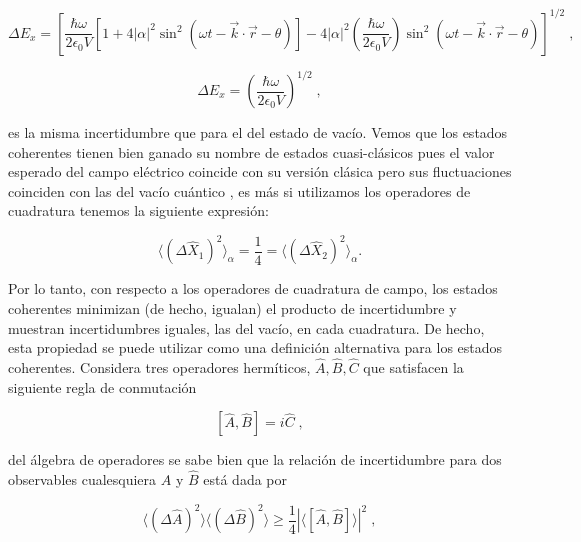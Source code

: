     \begin{equation}
        \Delta E_x = \left[\frac{\hbar\omega}{2\epsilon_0 V}\left[1 + 4|\alpha|^2\sin^2(\omega t - \Vec{k}\cdot \Vec{r} - \theta) \right] - 4|\alpha|^2\left(\frac{\hbar \omega}{2\epsilon_0V}\right)\sin^2(\omega t - \Vec{k}\cdot \Vec{r} - \theta) \right]^{1/2}\;,
    \end{equation}

    \begin{equation}
        \Delta E_x = \left(\frac{\hbar \omega}{2\epsilon_0 V} \right)^{1/2}\;,
    \end{equation}

    es la misma incertidumbre que para el del estado de vacío. Vemos que los estados coherentes tienen bien ganado su nombre de estados cuasi-clásicos pues el valor esperado del campo eléctrico coincide con su versión clásica pero sus fluctuaciones coinciden con las del vacío cuántico , es más si utilizamos los operadores de cuadratura tenemos la siguiente expresión:

    \begin{equation}
        \langle \left(\Delta\hat{X}_1\right)^2 \rangle_{\alpha} = \frac{1}{4} =  \langle \left(\Delta\hat{X}_2\right)^2 \rangle_{\alpha}.
    \end{equation}

    Por lo tanto, con respecto a los operadores de cuadratura de campo, los estados coherentes minimizan (de hecho, igualan) el producto de incertidumbre y muestran incertidumbres iguales, las del vacío, en cada cuadratura. De hecho, esta propiedad se puede utilizar como una definición alternativa para los estados coherentes. Considera tres operadores hermíticos, $\hat{A} , \hat{B} , \hat{C}$  que satisfacen la siguiente regla de conmutación

    \begin{equation}\label{eq:condiABC}
        \left[\hat{A} , \hat{B}\right] = i \hat{C}\;,
    \end{equation}

    del álgebra de operadores \cite{zettili2009quantum} se sabe bien que la relación de incertidumbre para dos observables cualesquiera $\hat{A}$ y $\hat{B}$ está dada por

    \begin{equation}
        \langle (\Delta\hat{A})^2 \rangle \langle (\Delta\hat{B})^2 \rangle \geq \frac{1}{4} \left|\langle [\hat{A},\hat{B}]\rangle \right|^{2}\;,
    \end{equation}

